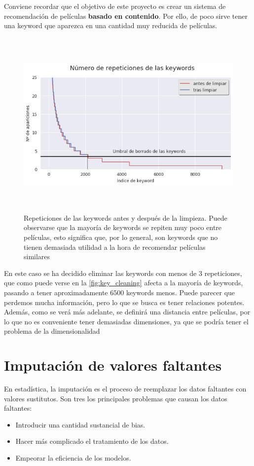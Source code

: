 Conviene recordar que el objetivo de este proyecto es crear un sistema de recomendación de películas \textbf{basado en contenido}. Por ello, de poco sirve tener una keyword que aparezca en una cantidad muy reducida de películas.

\begin{figure}[H]
    \centering
    \captionsetup{width=12cm}
    \includegraphics[height=9.3cm]{./contenido/imagenes/keyword_cleaning.png}
\caption{Repeticiones de las keywords antes y después de la limpieza. Puede observarse que la mayoría de keywords se repiten muy poco entre películas, esto significa que, por lo general, son keywords que no tienen demasiada utilidad a la hora de recomendar películas similares}
\label{fig:key_cleaning}
\end{figure}

En este caso se ha decidido eliminar las keywords con menos de $3$ repeticiones, que como puede verse en la \autoref{fig:key_cleaning} afecta a la mayoría de keywords, pasando a tener aproximadamente $6500$ keywords menos. Puede parecer que perdemos mucha información, pero lo que se busca es tener relaciones potentes. Además, como se verá más adelante, se definirá una distancia entre películas, por lo que no es conveniente tener demasiadas dimensiones, ya que se podría tener el problema de la dimensionalidad \cite{wiki:CurseOfDimensionality}

\newpage
\section{Imputación de valores faltantes}

En estadística, la imputación es el proceso de reemplazar los datos faltantes con valores sustitutos. Son tres los principales problemas que causan los datos faltantes:
\begin{itemize}
    \item Introducir una cantidad sustancial de bias.
    \item Hacer más complicado el tratamiento de los datos.
    \item Empeorar la eficiencia de los modelos.
\end{itemize}

